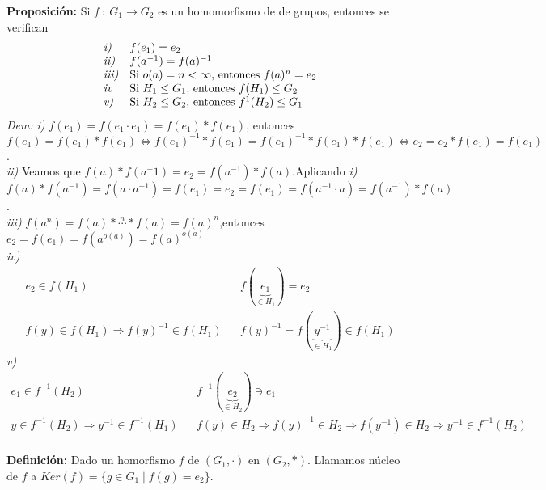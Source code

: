 \documentclass{article}
\begin{document}

\textbf{Proposición:} Si  $f\::\:G_1\longrightarrow G_2$ es un homomorfismo de de grupos, entonces se verifican\\
$$
\begin{array}{ll}
\text{\textit{i)}} & \text{$f(e_1)=e_2$}\\
\text{\textit{ii)}} & \text{$f(a^{-1})=f(a)^{-1}$}\\
\text{\textit{iii)}} & \text{Si $o(a)=n<\infty$, entonces $f(a)^n=e_2$}\\
\text{\textit{iv}} & \text{Si $H_1\le G_1$, entonces $f(H_1)\le G_2$}\\
\text{\textit{v)}} & \text{Si $H_2\le G_2$, entonces $f^1(H_2)\le G_1$}\\
\end{array}
$$
\textit{Dem:} \textit{i)} $f(e_1)=f(e_1\cdot e_1)=f(e_1)*f(e_1)$,  entonces $f(e_1)=f(e_1)*f(e_1) \Leftrightarrow f(e_1)^{-1} * f(e_1)= f(e_1)^{-1}*f(e_1)*f(e_1) \Leftrightarrow e_2=e_2*f(e_1)=f(e_1)$.\\ \textit{ii)} Veamos que $f(a)*f(a^-1)=e_2=f(a^{-1})*f(a)$.Aplicando \textit{i)} $f(a)*f(a^{-1})=f(a\cdot a^{-1})=f(e_1)=e_2=f(e_1)=f(a^{-1}\cdot a)=f(a^{-1})*f(a)$.\\
\textit{iii)} $f(a^n)=f(a)*\overset{n}{\cdots}*f(a)=f(a)^n$,entonces $e_2=f(e_1)=f(a^{o(a)})=f(a)^{o(a)}$\\
\textit{iv)}
$$
\begin{array}{rcl}
e_2\in f(H_1) && f(\underbrace{e_1}_{\in H_1})=e_2 \\
f(y)\in f(H_1)\Rightarrow f(y)^{-1}\in f(H_1) && f(y)^{-1}=f(\underbrace{y^{-1}}_{\in H_1})\in f(H_1)
\end{array}
$$
\textit{v)}
$$
\begin{array}{rcl}
e_1\in f^{-1}(H_2) && f^{-1}(\underbrace{e_2}_{\in H_2})\ni e_1 \\
y\in f^{-1}(H_2)\Rightarrow y^{-1}\in f^{-1}(H_1) && f(y)\in H_2 \Rightarrow f(y)^{-1}\in H_2\Rightarrow f(y^{-1})\in H_2 \Rightarrow y^{-1}\in f^{-1}(H_2)
\end{array}
$$\\


\textbf{Definición:} Dado un homorfismo $f$ de $(G_1,\cdot)$ en $(G_2,*)$. Llamamos núcleo de $f$ a $Ker(f)=\{ g\in G_1 \mid f(g)=e_2 \}$.\\\\

\end{document}
